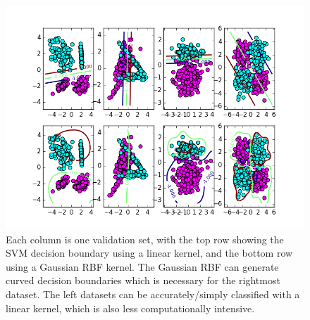 \begin{figure}
	\centering
	\includegraphics [trim=0 0 0 0, clip, angle=0, width=0.8\columnwidth,
	keepaspectratio]{figures/2_3_decisions}
	\caption{Each column is one validation set, with the top row showing the SVM decision boundary using a linear kernel, and the bottom row using a Gaussian RBF kernel. The Gaussian RBF can generate curved decision boundaries which is necessary for the rightmost dataset. The left datasets can be accurately/simply classified with a linear kernel, which is also less computationally intensive.}
	\label{fig:2_3_decisions} 
\end{figure}

